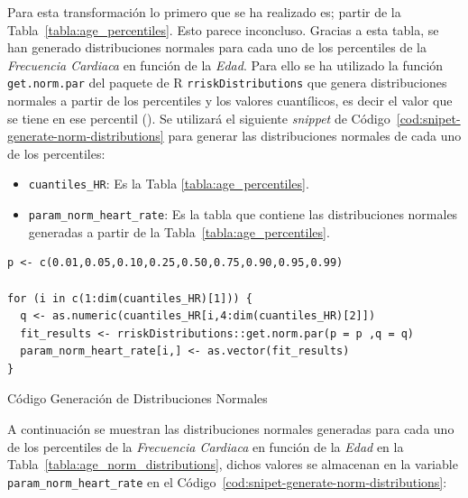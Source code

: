 \restoregeometry 

Para esta transformación lo primero que se ha realizado es; partir de la Tabla~\ref{tabla:age_percentiles}. {\color{blue} Esto parece inconcluso.} Gracias a esta tabla, se han generado distribuciones normales para cada uno de los percentiles de la \textit{Frecuencia Cardiaca} en función de la \textit{Edad}. Para ello se ha utilizado la función \texttt{get.norm.par} del paquete de R \texttt{rriskDistributions} que genera distribuciones normales a partir de los percentiles y los valores cuantílicos, es decir el valor que se tiene en ese percentil (\cite{rriskDistributions}). Se utilizará el siguiente \textit{snippet} de Código~\ref{cod:snipet-generate-norm-distributions} para generar las distribuciones normales de cada uno de los percentiles:

\begin{itemize}
    \item \texttt{cuantiles\_HR}: Es la Tabla \ref{tabla:age_percentiles}.
    \item \texttt{param\_norm\_heart\_rate}: Es la tabla que contiene las distribuciones normales generadas a partir de la Tabla~\ref{tabla:age_percentiles}.
\end{itemize}

\begin{code}[H]
\begin{lstlisting}
p <- c(0.01,0.05,0.10,0.25,0.50,0.75,0.90,0.95,0.99)

for (i in c(1:dim(cuantiles_HR)[1])) {
  q <- as.numeric(cuantiles_HR[i,4:dim(cuantiles_HR)[2]])
  fit_results <- rriskDistributions::get.norm.par(p = p ,q = q)
  param_norm_heart_rate[i,] <- as.vector(fit_results)
}
\end{lstlisting}
\caption{Código Generación de Distribuciones Normales}
\label{cod:snipet-generate-norm-distributions}
\end{code}

A continuación se muestran las distribuciones normales generadas para cada uno de los percentiles de la \textit{Frecuencia Cardiaca} en función de la \textit{Edad} en la Tabla~\ref{tabla:age_norm_distributions}, dichos valores se almacenan en la variable \texttt{param\_norm\_heart\_rate} en el Código~\ref{cod:snipet-generate-norm-distributions}:


